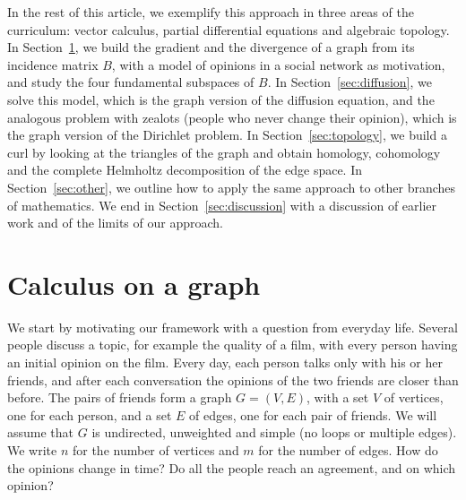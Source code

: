 \documentclass[11pt,a4paper]{article}
\theoremstyle{plain}
\theoremstyle{definition}
\begin{document}
In the rest of this article, we exemplify this approach in three areas of the curriculum: vector calculus, partial differential equations and algebraic topology. In Section~\ref{sec:calculus}, we build the gradient and the divergence of a graph from its incidence matrix $B$, with a model of opinions in a social network as motivation, and study the four fundamental subspaces of $B$. In Section~\ref{sec:diffusion}, we solve this model, which is the graph version of the diffusion equation, and the analogous problem with zealots (people who never change their opinion), which is the graph version of the Dirichlet problem. In Section~\ref{sec:topology}, we build a curl by looking at the triangles of the graph and obtain homology, cohomology and the complete Helmholtz decomposition of the edge space. In Section~\ref{sec:other}, we outline how to apply the same approach to other branches of mathematics. We end in Section~\ref{sec:discussion} with a discussion of earlier work and of the limits of our approach.

\section{Calculus on a graph}\label{sec:calculus}

We start by motivating our framework with a question from everyday life. Several people discuss a topic, for example the quality of a film, with every person having an initial opinion on the film. Every day, each person talks only with his or her friends, and after each conversation the opinions of the two friends are closer than before. The pairs of friends form a graph $G=(V,E)$, with a set $V$ of vertices, one for each person, and a set $E$ of edges, one for each pair of friends. We will assume that $G$ is undirected, unweighted and simple (no loops or multiple edges). We write $n$ for the number of vertices and $m$ for the number of edges. How do the opinions change in time? Do all the people reach an agreement, and on which opinion?
\end{document}
